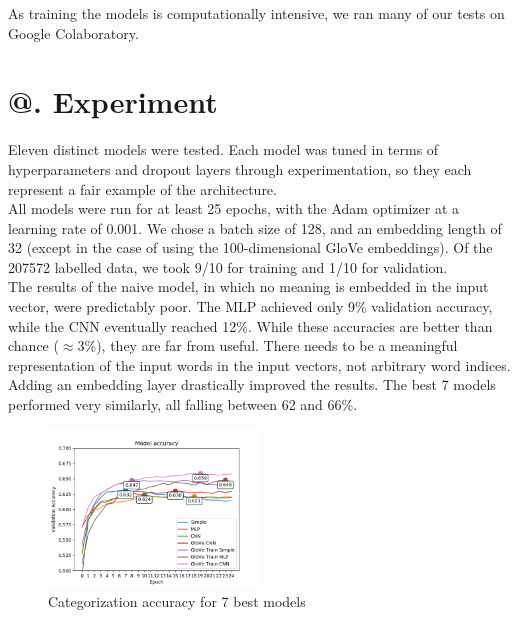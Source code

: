 \documentclass[jou,apacite, 10px]{apa6}
\makeatletter
\newcommand*{\rom}[1]{\expandafter\@slowromancap\romannumeral #1@}
\makeatother
\begin{document}


\rule{0pt}{4ex} As training the models is computationally intensive, we ran many of our tests on Google Colaboratory.\\

\section{\rom{5}. Experiment}
Eleven distinct models were tested. Each model was tuned in terms of hyperparameters and dropout layers through experimentation, so they each represent a fair example of the architecture.\\

All models were run for at least 25 epochs, with the Adam optimizer at a learning rate of 0.001. We chose a batch size of 128, and an embedding length of 32 (except in the case of using the 100-dimensional GloVe embeddings). Of the 207572 labelled data, we took 9/10 for training and 1/10 for validation.\\

The results of the naive model, in which no meaning is embedded in the input vector, were predictably poor. The MLP achieved only 9\% validation accuracy, while the CNN eventually reached 12\%. While these accuracies are better than chance ($\approx$3\%), they are far from useful. There needs to be a meaningful representation of the input words in the input vectors, not arbitrary word indices.\\

Adding an embedding layer drastically improved the results. The best 7 models performed very similarly, all falling between 62 and 66\%.

\begin{figure}[h!]
\captionsetup{justification=centering}
    \centering
     \includegraphics[width=0.5\textwidth]{images/good_models_comparison_small}
        \caption{Categorization accuracy for 7 best models}
\end{figure}
\end{document}
